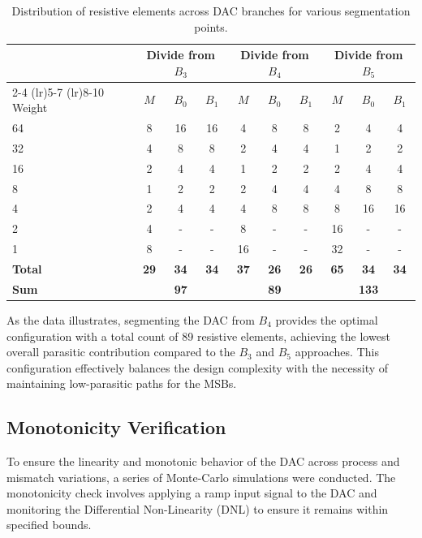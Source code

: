 \begin{table}[H]
    \centering
    \renewcommand{\arraystretch}{1.2}
    \begin{tabular}{l c c c c c c c c c}
        \toprule
        & \multicolumn{3}{c}{\textbf{Divide from $B_3$}} & \multicolumn{3}{c}{\textbf{Divide from $B_4$}} & \multicolumn{3}{c}{\textbf{Divide from $B_5$}} \\
        \cmidrule(lr){2-4} \cmidrule(lr){5-7} \cmidrule(lr){8-10}
        Weight & $M$ & $B_0$ & $B_1$ & $M$ & $B_0$ & $B_1$ & $M$ & $B_0$ & $B_1$ \\
        \midrule
        64 & 8 & 16 & 16 & 4 & 8 & 8 & 2 & 4 & 4 \\
        32 & 4 & 8 & 8 & 2 & 4 & 4 & 1 & 2 & 2 \\
        16 & 2 & 4 & 4 & 1 & 2 & 2 & 2 & 4 & 4 \\
        8 & 1 & 2 & 2 & 2 & 4 & 4 & 4 & 8 & 8 \\
        4 & 2 & 4 & 4 & 4 & 8 & 8 & 8 & 16 & 16 \\
        2 & 4 & - & - & 8 & - & - & 16 & - & - \\
        1 & 8 & - & - & 16 & - & - & 32 & - & - \\
        \midrule
        \textbf{Total} & \textbf{29} & \textbf{34} & \textbf{34} & \textbf{37} & \textbf{26} & \textbf{26} & \textbf{65} & \textbf{34} & \textbf{34} \\
        \textbf{Sum} & \multicolumn{3}{c}{\textbf{97}} & \multicolumn{3}{c}{\textbf{89}} & \multicolumn{3}{c}{\textbf{133}} \\
        \bottomrule
    \end{tabular}
    \caption{Distribution of resistive elements across DAC branches for various segmentation points.}
    \label{tab:dac_segmentation}
\end{table}

As the data illustrates, segmenting the DAC from $B_4$ provides the optimal configuration with a total count of 89 resistive elements, achieving the lowest overall parasitic contribution compared to the $B_3$ and $B_5$ approaches. This configuration effectively balances the design complexity with the necessity of maintaining low-parasitic paths for the MSBs.
\newpage
\subsection{Monotonicity Verification}
\label{sec:monotonicity}

To ensure the linearity and monotonic behavior of the DAC across process and mismatch variations, a series of Monte-Carlo simulations were conducted. The monotonicity check involves applying a ramp input signal to the DAC and monitoring the Differential Non-Linearity (DNL) to ensure it remains within specified bounds.

